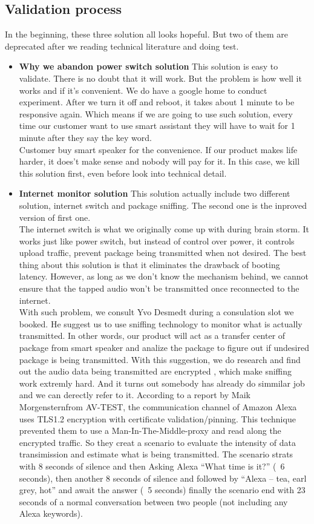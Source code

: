 \documentclass[12pt,twoside]{article}
\begin{document}
\subsection{Validation process}
In the beginning, these three solution all looks hopeful. But two of them are deprecated after we reading technical literature and doing test.
\begin{itemize}
\item \textbf{Why we abandon power switch solution} This solution is easy to validate. There is no doubt that it will work. But the problem is 
how well it works and if it's convenient. We do have a google home to conduct experiment. After we turn it off and reboot, it takes about 
1 minute to be responsive again. Which means if we are going to use such solution, every time our customer want to use smart assistant they 
will have to wait for 1 minute after they say the key word.\\
Customer buy smart speaker for the convenience. If our product makes life harder, it does't make sense and nobody will pay for it.
In this case, we kill this solution first, even before look into technical detail.
\item \textbf{Internet monitor solution} This solution actually include two different solution, internet switch and 
package sniffing. The second one is the inproved version of first one.\\
The internet switch is what we originally come up with during brain storm. It works just like power switch, but instead of control over power, 
it controls upload traffic, prevent package being transmitted when not desired. The best thing about this solution is that it eliminates the 
drawback of booting latency. However, as long as we don't know the mechanism behind, we cannot ensure that the tapped audio won't be transmitted 
once reconnected to the internet. \\
With such problem, we consult Yvo Desmedt during a consulation slot we booked. He suggest us to use sniffing technology to monitor what is
actually transmitted. In other words, our product will act as a transfer center of package from smart speaker and analize the package to 
figure out if undesired package is being transmitted.
With this suggestion, we do research and find out the audio data being transmitted are encrypted \cite{googlepolicy}, which make sniffing 
work extremly hard. And it turns out somebody has already do simmilar job and we can derectly refer to it. According to a report 
\cite{sniffingresult} by Maik Morgensternfrom AV-TEST, the communication channel of Amazon Alexa uses TLS1.2 encryption with certificate 
validation/pinning. This technique prevented them to use a Man-In-The-Middle-proxy and read along the encrypted traffic. So they creat a 
scenario to evaluate the intensity of data transimission and estimate what is being transmitted. The scenario strats with 8 seconds of silence 
and then Asking Alexa “What time is it?” (~6 seconds), then another 8 seconds of silence and followed by “Alexa – tea, earl grey, hot” and 
await the answer (~5 seconds) finally the scenario end with 23 seconds of a normal conversation between two people (not including any Alexa keywords).
 

\end{itemize}
\end{document}
